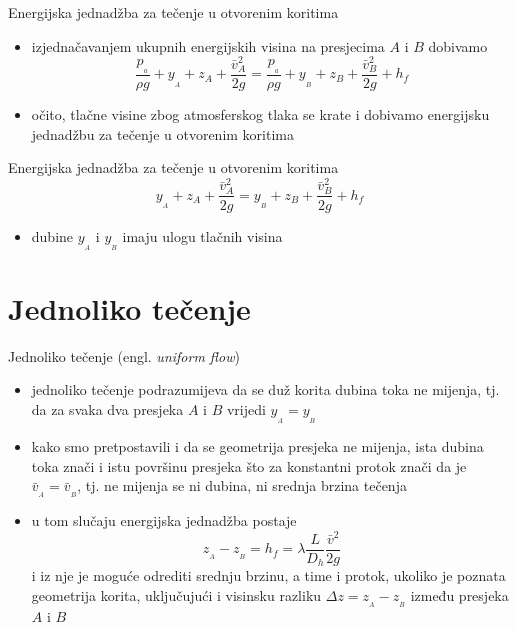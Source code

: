 \documentclass{beamer}
\begin{document}
\begin{frame}{Energijska jednadžba za tečenje u otvorenim koritima}

\begin{itemize}
\item izjednačavanjem ukupnih energijskih visina na presjecima $A$ i $B$
dobivamo
\[
\frac{p_{_{a}}}{\rho g}+y_{_{A}}+z_{{\scriptscriptstyle A}}+\frac{\bar{v}_{{\scriptscriptstyle A}}^{2}}{2g}=\frac{p_{_{a}}}{\rho g}+y_{_{B}}+z_{{\scriptscriptstyle B}}+\frac{\bar{v}_{{\scriptscriptstyle B}}^{2}}{2g}+h_{f}
\]
\item očito, tlačne visine zbog atmosferskog tlaka se krate i dobivamo energijsku
jednadžbu za tečenje u otvorenim koritima
\end{itemize}
\begin{alertblock}{Energijska jednadžba za tečenje u otvorenim koritima}
\[
y_{_{A}}+z_{{\scriptscriptstyle A}}+\frac{\bar{v}_{{\scriptscriptstyle A}}^{2}}{2g}=y_{_{B}}+z_{{\scriptscriptstyle B}}+\frac{\bar{v}_{{\scriptscriptstyle B}}^{2}}{2g}+h_{f}
\]
\end{alertblock}
\begin{itemize}
\item dubine $y_{_{A}}$ i $y_{_{B}}$ imaju ulogu tlačnih visina
\end{itemize}
\end{frame}

\section{Jednoliko tečenje}
\begin{frame}{Jednoliko tečenje (engl. \emph{uniform flow})}

\begin{itemize}
\item \alert{jednoliko tečenje} podrazumijeva da se duž korita dubina
toka ne mijenja, tj. da za svaka dva presjeka $A$ i $B$ vrijedi
$y_{_{A}}=y_{_{B}}$
\item kako smo pretpostavili i da se geometrija presjeka ne mijenja, ista
dubina toka znači i istu površinu presjeka što za konstantni protok
znači da je $\bar{v}_{_{A}}=\bar{v}_{_{B}}$, tj. ne mijenja se ni
dubina, ni srednja brzina tečenja
\item u tom slučaju energijska jednadžba postaje
\[
z_{_{A}}-z_{_{B}}=h_{f}=\lambda\frac{L}{D_{h}}\frac{\bar{v}^{2}}{2g}
\]
i iz nje je moguće odrediti srednju brzinu, a time i protok, ukoliko
je poznata geometrija korita, uključujući i visinsku razliku $\Delta z=z_{_{A}}-z_{_{B}}$
između presjeka $A$ i $B$
\end{itemize}
\end{frame}
\end{document}
